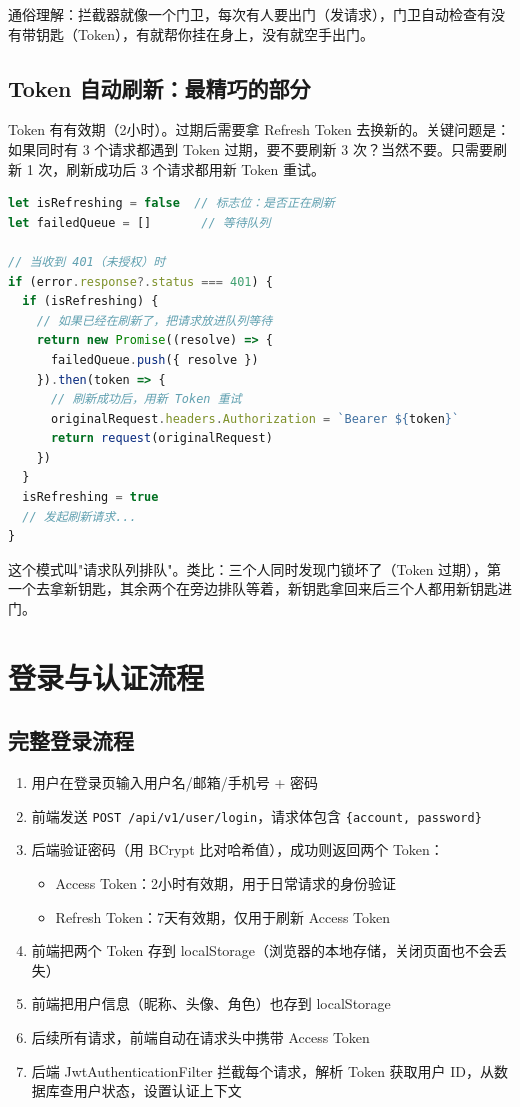 \documentclass[12pt,a4paper]{ctexart}
\begin{document}
通俗理解：拦截器就像一个门卫，每次有人要出门（发请求），门卫自动检查有没有带钥匙（Token），有就帮你挂在身上，没有就空手出门。

\subsection{Token 自动刷新：最精巧的部分}

Token 有有效期（2小时）。过期后需要拿 Refresh Token 去换新的。关键问题是：如果同时有 3 个请求都遇到 Token 过期，要不要刷新 3 次？当然不要。只需要刷新 1 次，刷新成功后 3 个请求都用新 Token 重试。

\begin{lstlisting}[language=JavaScript]
let isRefreshing = false  // 标志位：是否正在刷新
let failedQueue = []       // 等待队列

// 当收到 401（未授权）时
if (error.response?.status === 401) {
  if (isRefreshing) {
    // 如果已经在刷新了，把请求放进队列等待
    return new Promise((resolve) => {
      failedQueue.push({ resolve })
    }).then(token => {
      // 刷新成功后，用新 Token 重试
      originalRequest.headers.Authorization = `Bearer ${token}`
      return request(originalRequest)
    })
  }
  isRefreshing = true
  // 发起刷新请求...
}
\end{lstlisting}

这个模式叫"请求队列排队"。类比：三个人同时发现门锁坏了（Token 过期），第一个去拿新钥匙，其余两个在旁边排队等着，新钥匙拿回来后三个人都用新钥匙进门。

\section{登录与认证流程}

\subsection{完整登录流程}

\begin{enumerate}
  \item 用户在登录页输入用户名/邮箱/手机号 + 密码
  \item 前端发送 \texttt{POST /api/v1/user/login}，请求体包含 \texttt{\{account, password\}}
  \item 后端验证密码（用 BCrypt 比对哈希值），成功则返回两个 Token：
    \begin{itemize}
      \item Access Token：2小时有效期，用于日常请求的身份验证
      \item Refresh Token：7天有效期，仅用于刷新 Access Token
    \end{itemize}
  \item 前端把两个 Token 存到 localStorage（浏览器的本地存储，关闭页面也不会丢失）
  \item 前端把用户信息（昵称、头像、角色）也存到 localStorage
  \item 后续所有请求，前端自动在请求头中携带 Access Token
  \item 后端 JwtAuthenticationFilter 拦截每个请求，解析 Token 获取用户 ID，从数据库查用户状态，设置认证上下文
\end{enumerate}
\end{document}
